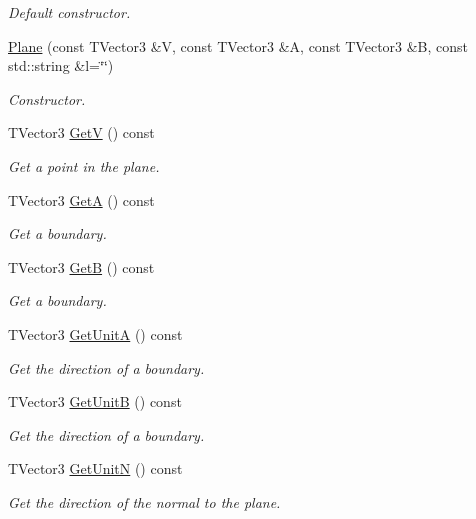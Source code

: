 \begin{DoxyCompactItemize}
\begin{DoxyCompactList}\small\item\em Default constructor. \end{DoxyCompactList}\item 
\hyperlink{classcalib_1_1Plane_a5dedbdde7cfed3c62e0cd9a95cc1caf3}{Plane} (const T\-Vector3 \&V, const T\-Vector3 \&A, const T\-Vector3 \&B, const std\-::string \&l=\char`\"{}\char`\"{})
\begin{DoxyCompactList}\small\item\em Constructor. \end{DoxyCompactList}\item 
T\-Vector3 \hyperlink{classcalib_1_1Plane_a30e4c2891270c69e565e4e5baf7ffaf8}{Get\-V} () const 
\begin{DoxyCompactList}\small\item\em Get a point in the plane. \end{DoxyCompactList}\item 
T\-Vector3 \hyperlink{classcalib_1_1Plane_a1853ae99310b7a9b6c83eb0aa322570d}{Get\-A} () const 
\begin{DoxyCompactList}\small\item\em Get a boundary. \end{DoxyCompactList}\item 
T\-Vector3 \hyperlink{classcalib_1_1Plane_a2e26ce75b69a06b3cdf075201f658070}{Get\-B} () const 
\begin{DoxyCompactList}\small\item\em Get a boundary. \end{DoxyCompactList}\item 
T\-Vector3 \hyperlink{classcalib_1_1Plane_ad148c0cf52a30b07f1467ca143be9497}{Get\-Unit\-A} () const 
\begin{DoxyCompactList}\small\item\em Get the direction of a boundary. \end{DoxyCompactList}\item 
T\-Vector3 \hyperlink{classcalib_1_1Plane_a9f15b0528238dceb553463727402537d}{Get\-Unit\-B} () const 
\begin{DoxyCompactList}\small\item\em Get the direction of a boundary. \end{DoxyCompactList}\item 
T\-Vector3 \hyperlink{classcalib_1_1Plane_a90545891fdcacd17a11dc49bf67a7305}{Get\-Unit\-N} () const 
\begin{DoxyCompactList}\small\item\em Get the direction of the normal to the plane. \end{DoxyCompactList}\item 

\end{DoxyCompactItemize}
